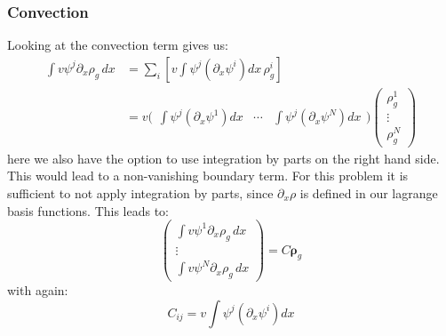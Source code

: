 \subsubsection*{Convection}
Looking at the convection term gives us:
\begin{equation*}
    \begin{aligned}
        \int v\psi^j\partial_x \rho_g \, dx &= \sum_i\left[v \int\psi^j(\partial_x\psi^i)dx \, \rho_g^i
        \right]\\
        & = v\bigg( \begin{matrix}
              \int\psi^j(\partial_x\psi^1)dx 
            & \cdots 
            & \int\psi^j(\partial_x\psi^N)dx
        \end{matrix}\bigg)
        \begin{pmatrix}
            \rho_g^1 \\ \vdots \\ \rho_g^N
        \end{pmatrix}
    \end{aligned}
\end{equation*}
here we also have the option to use integration by parts on the right hand side. This would lead to a non-vanishing boundary term. For this problem it is sufficient to not apply integration by parts, since $\partial_x \rho$ is defined in our lagrange basis functions. This leads to:
\begin{equation*}
    \begin{pmatrix}
        \int v\psi^1\partial_x \rho_g \, dx \\ \vdots \\
        \int v\psi^N\partial_x \rho_g \, dx
    \end{pmatrix} = C \boldsymbol{\rho}_g
\end{equation*}
with again:
\begin{equation*}
    C_{ij} = v\int\psi^j(\partial_x\psi^i)dx
\end{equation*}

